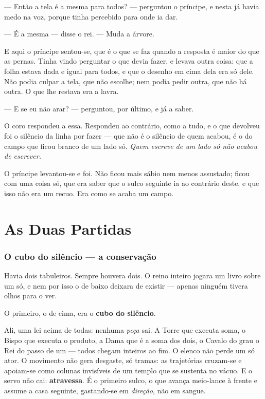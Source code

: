 \documentclass[livro.tex]{subfiles}
\begin{document}
\medskip

--- Então a tela é a mesma para todos? --- perguntou o príncipe, e nesta já havia medo na voz,
porque tinha percebido para onde ia dar.

--- É a mesma --- disse o rei. --- Muda a árvore.

\medskip

E aqui o príncipe sentou-se, que é o que se faz quando a resposta é maior do que as pernas. Tinha
vindo perguntar o que devia fazer, e levava outra coisa: que a folha estava dada e igual para
todos, e que o desenho em cima dela era só dele. Não podia culpar a tela, que não escolhe; nem
podia pedir outra, que não há outra. O que lhe restava era a lavra.

\medskip

--- E se eu não arar? --- perguntou, por último, e já a saber.

O coro respondeu a essa. Respondeu ao contrário, como a tudo, e o que devolveu foi o silêncio da
linha por fazer --- que não é o silêncio de quem acabou, é o do campo que ficou branco de um lado
só. \emph{Quem escreve de um lado só não acabou de escrever.}

\medskip

O príncipe levantou-se e foi. Não ficou mais sábio nem menos assustado; ficou com uma coisa só,
que era saber que o sulco seguinte ia ao contrário deste, e que isso não era um recuo. Era como
se acaba um campo.




\part{As Duas Partidas}

\section{O cubo do silêncio --- a conservação}

Havia dois tabuleiros. Sempre houvera dois. O reino inteiro jogara um livro sobre
um só, e nem por isso o de baixo deixara de existir --- apenas ninguém tivera olhos
para o ver.

O primeiro, o de cima, era o \textbf{cubo do silêncio}.

\medskip

Ali, uma lei acima de todas: nenhuma \emph{peça} sai. A Torre que executa soma,
o Bispo que executa o produto, a Dama que é a soma dos dois, o Cavalo do grau
o Rei do passo de um --- todos chegam inteiros ao fim. O elenco não perde
um só ator. O movimento não gera desgaste, só tramas: as trajetórias cruzam-se e
apoiam-se como colunas invisíveis de um templo que se sustenta no vácuo. E o servo não
cai: \textbf{atravessa}. É o primeiro sulco, o que avança
meio-lance à frente e assume a casa seguinte, gastando-se em \emph{direção}, não em
sangue.
\end{document}
